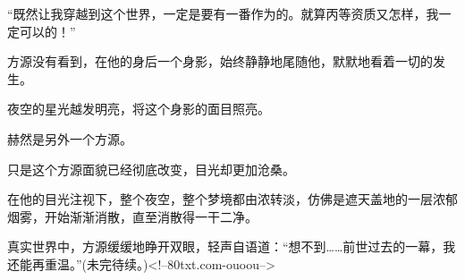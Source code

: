 \begin{this_body}
“既然让我穿越到这个世界，一定是要有一番作为的。就算丙等资质又怎样，我一定可以的！”

方源没有看到，在他的身后一个身影，始终静静地尾随他，默默地看着一切的发生。

夜空的星光越发明亮，将这个身影的面目照亮。

赫然是另外一个方源。

只是这个方源面貌已经彻底改变，目光却更加沧桑。

在他的目光注视下，整个夜空，整个梦境都由浓转淡，仿佛是遮天盖地的一层浓郁烟雾，开始渐渐消散，直至消散得一干二净。

真实世界中，方源缓缓地睁开双眼，轻声自语道：“想不到……前世过去的一幕，我还能再重温。”(未完待续。)<!--80txt.com-ouoou-->

\end{this_body}

